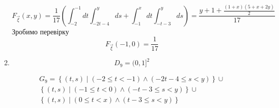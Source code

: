 \documentclass{article}
\begin{document}
\begin{enumerate}
\begin{center}
	\end{center}
	\[
	F_{\overrightarrow{\xi}} (x, y) =\frac{1}{17}\left( \int_{-2}^{-1}dt\int_{-2t-4}^{y} ds +  \int_{-1}^{x}dt\int_{-t-3}^{y} ds \right) = \frac{y + 1 + \frac{(1 + x) (5 + x + 2 y)}{2}}{17} 
	\]
	Зробимо перевірку 
	\[
	F_{\overrightarrow{\xi}} (-1, 0) = \frac{1}{17}
	\]
	\newpage
	\item
	
	\[
	D_9 = (0, 1]^2 
	\]
	
	\[
	\begin{gathered}
		G_9 = \left\{ (t, s) \middle\vert (-2 \leq t < -1) \wedge ( -2t-4 \leq s < y) \right\} \cup \\ \left\{ (t, s) \middle\vert (-1 \leq t < 0) \wedge ( -t-3 \leq s < y) \right\} \cup \\ 
		\left\{ (t, s) \middle\vert (0 \leq t < x) \wedge ( t-3 \leq s < y) \right\}
	\end{gathered}
	\]
	

\end{enumerate}
\end{document}

